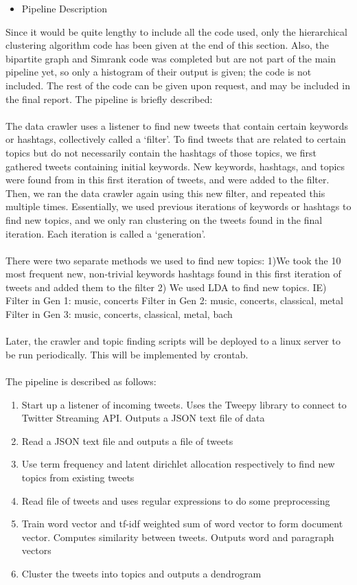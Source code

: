\documentclass[10pt]{article}
\begin{document}
\begin{itemize}
	\item Pipeline Description
\end{itemize}
Since it would be quite lengthy to include all the code used, only the hierarchical clustering algorithm code has been given at the end of this section. Also, the bipartite graph and Simrank code was completed but are not part of the main pipeline yet, so only a histogram of their output is given; the code is not included. The rest of the code can be given upon request, and may be included in the final report. The pipeline is briefly described:
\\\\
The data crawler uses a listener to find new tweets that contain certain keywords or hashtags, collectively called a ‘filter’. To find tweets that are related to certain topics but do not necessarily contain the hashtags of those topics, we first gathered tweets containing initial keywords. New keywords, hashtags, and topics were found from in this first iteration of tweets, and were added to the filter. Then, we ran the data crawler again using this new filter, and repeated this multiple times. Essentially, we used previous iterations of keywords or hashtags to find new topics, and we only ran clustering on the tweets found in the final iteration. Each iteration is called a ‘generation’.
\\\\
There were two separate methods we used to find new topics: 
1)We took the 10 most frequent new, non-trivial keywords hashtags found in this first iteration of tweets and added them to the filter 
2) We used LDA to find new topics. 
IE)
Filter in Gen 1: music, concerts
Filter in Gen 2: music, concerts, classical, metal
Filter in Gen 3: music, concerts, classical, metal, bach
\\\\
Later, the crawler and topic finding scripts will be deployed to a linux server to be run periodically. This will be implemented by crontab.
\\\\
The pipeline is described as follows:
\begin{enumerate}
	\item Start up a listener of incoming tweets. Uses the Tweepy library to connect to Twitter Streaming API. Outputs a JSON text file of data
	\item Read a JSON text file and outputs a file of tweets
	\item Use term frequency and latent dirichlet allocation respectively to find new topics from existing tweets
	\item Read file of tweets and uses regular expressions to do some preprocessing
	\item  Train word vector and tf-idf weighted sum of word vector to form document vector. Computes similarity between tweets. Outputs word and paragraph vectors
	\item Cluster the tweets into topics and outputs a dendrogram
\end{enumerate}
\end{document}
